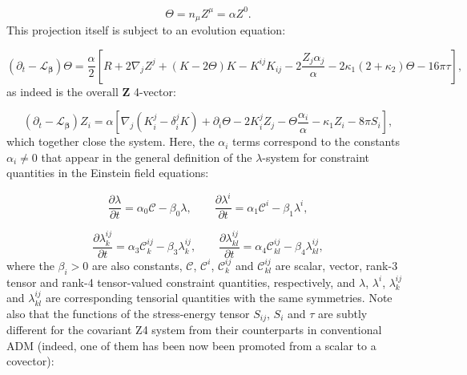 \documentclass{article}
\begin{document}
\begin{equation}
\Theta = n_{\mu} Z^{\mu} = \alpha Z^0.
\end{equation}
This projection itself is subject to an evolution equation:

\begin{equation}
\left( \partial_t - \mathcal{L}_{\boldsymbol\beta} \right) \Theta = \frac{\alpha}{2} \left[ R + 2 \nabla_j Z^j + \left( K - 2 \Theta \right) K - K^{i j} K_{i j} - 2 \frac{Z_j \alpha_j}{\alpha} - 2 \kappa_1 \left( 2 + \kappa_2 \right) \Theta - 16 \pi \tau \right],
\end{equation}
as indeed is the overall ${\mathbf{Z}}$ 4-vector:

\begin{equation}
\left( \partial_t - \mathcal{L}_{\boldsymbol\beta} \right) Z_i = \alpha \left[ \nabla_j \left( K_{i}^{j} - \delta_{i}^{j} K \right) + \partial_i \Theta - 2 K_{i}^{j} Z_j - \Theta \frac{\alpha_i}{\alpha} - \kappa_1 Z_i - 8 \pi S_i \right],
\end{equation}
which together close the system. Here, the ${\alpha_i}$ terms correspond to the constants ${\alpha_i \neq 0}$ that appear in the general definition of the ${\lambda}$-system for constraint quantities in the Einstein field equations:

\begin{equation}
\frac{\partial \lambda}{\partial t} = \alpha_0 \mathcal{C} - \beta_0 \lambda, \qquad \frac{\partial \lambda^i}{\partial t} = \alpha_1 \mathcal{C}^i - \beta_1 \lambda^i,
\end{equation}

\begin{equation}
\frac{\partial \lambda_{k}^{i j}}{\partial t} = \alpha_3 \mathcal{C}_{k}^{i j} - \beta_3 \lambda_{k}^{i j}, \qquad \frac{\partial \lambda_{k l}^{i j}}{\partial t} = \alpha_4 \mathcal{C}_{k l}^{i j} - \beta_4 \lambda_{k l}^{i j},
\end{equation}
where the ${\beta_i > 0}$ are also constants, ${\mathcal{C}}$, ${\mathcal{C}^i}$, ${\mathcal{C}_{k}^{i j}}$ and ${\mathcal{C}_{k l}^{i j}}$ are scalar, vector, rank-3 tensor and rank-4 tensor-valued constraint quantities, respectively, and ${\lambda}$, ${\lambda^i}$, ${\lambda_{k}^{i j}}$ and ${\lambda_{k l}^{i j}}$ are corresponding tensorial quantities with the same symmetries. Note also that the functions of the stress-energy tensor ${S_{i j}}$, ${S_i}$ and ${\tau}$ are subtly different for the covariant Z4 system from their counterparts in conventional ADM (indeed, one of them has been now been promoted from a scalar to a covector):
\end{document}
